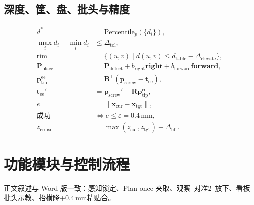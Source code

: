 \documentclass[12pt,a4paper]{article}
\begin{document}
\subsection{深度、筐、盘、批头与精度}
\begin{align}
d^{*}&=\mathrm{Percentile}_p(\{d_i\}),\\
\max_i d_i-\min_i d_i&\le\Delta_{\mathrm{tol}},\\
\mathrm{rim}&=\{(u,v)\mid d(u,v)\le d_{\mathrm{table}}-\Delta_{\mathrm{elevate}}\},\\
\mathbf{P}_{\mathrm{place}}&=\mathbf{P}_{\mathrm{detect}}+b_{\mathrm{right}}\mathbf{right}+b_{\mathrm{forward}}\mathbf{forward},\\
\mathbf{p}_{\mathrm{tip}}^{\mathrm{ee}}&=\mathbf{R}^{\mathsf{T}}(\mathbf{p}_{\mathrm{screw}}-\mathbf{t}_{\mathrm{ee}}),\\
\mathbf{t}_{\mathrm{ee}}'&=\mathbf{p}_{\mathrm{screw}}'-\mathbf{R}\mathbf{p}_{\mathrm{tip}}^{\mathrm{ee}},\\
e&=\lVert\mathbf{x}_{\mathrm{cur}}-\mathbf{x}_{\mathrm{tgt}}\rVert,\\
\text{成功}&\Leftrightarrow e\le\varepsilon=0.4\,\mathrm{mm},\\
z_{\mathrm{cruise}}&=\max(z_{\mathrm{cur}},z_{\mathrm{tgt}})+\Delta_{\mathrm{lift}}.
\end{align}

\section{功能模块与控制流程}
正文叙述与 Word 版一致：感知锁定、Plan-once 夹取、观察--对准2--放下、看板批头示教、抬横降+$0.4\,\mathrm{mm}$精贴合。
\end{document}
